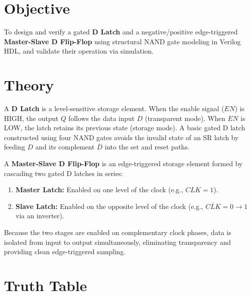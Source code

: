 \documentclass[12pt,a4paper]{report}
\begin{document}
\section{Objective}

To design and verify a gated \textbf{D Latch} and a negative/positive edge-triggered \textbf{Master-Slave D Flip-Flop} using structural NAND gate modeling in Verilog HDL, and validate their operation via simulation.

\section{Theory}

A \textbf{D Latch} is a level-sensitive storage element. When the enable signal ($EN$) is HIGH, the output $Q$ follows the data input $D$ (transparent mode). When $EN$ is LOW, the latch retains its previous state (storage mode). A basic gated D latch constructed using four NAND gates avoids the invalid state of an SR latch by feeding $D$ and its complement $\overline{D}$ into the set and reset paths.

A \textbf{Master-Slave D Flip-Flop} is an edge-triggered storage element formed by cascading two gated D latches in series:
\begin{enumerate}
    \item \textbf{Master Latch:} Enabled on one level of the clock (e.g., $CLK = 1$).
    \item \textbf{Slave Latch:} Enabled on the opposite level of the clock (e.g., $\overline{CLK} = 0 \rightarrow 1$ via an inverter).
\end{enumerate}

Because the two stages are enabled on complementary clock phases, data is isolated from input to output simultaneously, eliminating transparency and providing clean edge-triggered sampling.

\section{Truth Table}
\end{document}
